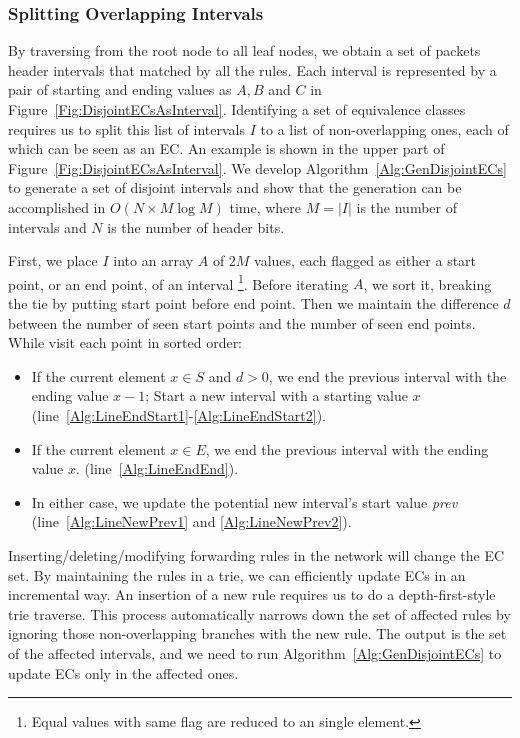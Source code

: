 \subsubsection{Splitting Overlapping Intervals}
By traversing from the root node to all leaf nodes, we obtain a set of packets header intervals that matched by all the rules. Each interval is represented by a pair of starting and ending values as $A, B$ and $C$ in Figure~\ref{Fig:DisjointECsAsInterval}. Identifying a set of equivalence classes requires us to split this list of intervals $I$ to a list of non-overlapping ones, each of which can be seen as an EC. An example is shown in the upper part of Figure~\ref{Fig:DisjointECsAsInterval}. 
We develop Algorithm~\ref{Alg:GenDisjointECs} to generate a set of disjoint intervals and show that the generation can be accomplished in $O(N \times M\log M)$ time,
where $M=|I|$ is the number of intervals and $N$ is the number of header bits.

First, we place $I$ into an array $A$ of $2M$ values,
each flagged as either a start point, or an end point, of an interval
\footnote{Equal values with same flag are reduced to an single element.}.
Before iterating $A$, we sort it, breaking the tie by putting start point before end point.
Then we maintain the difference $d$ between the number of seen start points and
the number of seen end points. While visit each point in sorted order:
\begin{itemize}
\item If the current element $x \in S$ and $d > 0$,
        we end the previous interval with the ending value $x - 1$;
        Start a new interval with a starting value $x$
        (line~\ref{Alg:LineEndStart1}-\ref{Alg:LineEndStart2}).
\item If the current element $x \in E$, we end the previous interval with the ending value $x$.
        (line~\ref{Alg:LineEndEnd}).
\item In either case, we update the potential new interval's start value \textit{prev}
        (line~\ref{Alg:LineNewPrev1} and \ref{Alg:LineNewPrev2}).
\end{itemize}

Inserting/deleting/modifying forwarding rules in the network will change the EC set.
By maintaining the rules in a trie, we can efficiently update ECs in an incremental way. An insertion of a new rule requires us to do a depth-first-style trie traverse. This process automatically narrows down the set of affected rules by ignoring those non-overlapping branches with the new rule.
The output is the set of the affected intervals, and we need to run Algorithm~\ref{Alg:GenDisjointECs} to update ECs only in the affected ones.


